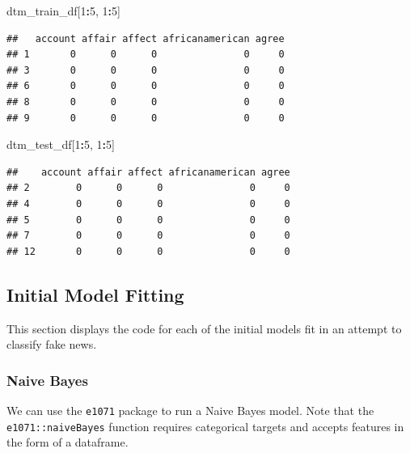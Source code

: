 \documentclass[12pt]{article}
\newenvironment{Shaded}{\begin{snugshade}}{\end{snugshade}}
\newcommand{\DecValTok}[1]{\textcolor[rgb]{0.00,0.00,0.81}{#1}}
\newcommand{\NormalTok}[1]{#1}
\newcommand{\OperatorTok}[1]{\textcolor[rgb]{0.81,0.36,0.00}{\textbf{#1}}}
\begin{document}
\begin{Shaded}
\begin{Highlighting}[]
\NormalTok{dtm_train_df[}\DecValTok{1}\OperatorTok{:}\DecValTok{5}\NormalTok{, }\DecValTok{1}\OperatorTok{:}\DecValTok{5}\NormalTok{]}
\end{Highlighting}
\end{Shaded}

\begin{verbatim}
##   account affair affect africanamerican agree
## 1       0      0      0               0     0
## 3       0      0      0               0     0
## 6       0      0      0               0     0
## 8       0      0      0               0     0
## 9       0      0      0               0     0
\end{verbatim}

\begin{Shaded}
\begin{Highlighting}[]
\NormalTok{dtm_test_df[}\DecValTok{1}\OperatorTok{:}\DecValTok{5}\NormalTok{, }\DecValTok{1}\OperatorTok{:}\DecValTok{5}\NormalTok{]}
\end{Highlighting}
\end{Shaded}

\begin{verbatim}
##    account affair affect africanamerican agree
## 2        0      0      0               0     0
## 4        0      0      0               0     0
## 5        0      0      0               0     0
## 7        0      0      0               0     0
## 12       0      0      0               0     0
\end{verbatim}

\newpage

\hypertarget{initial-model-fitting}{%
\subsection{Initial Model Fitting}\label{initial-model-fitting}}

\label{sec:appendix-initial-models}

This section displays the code for each of the initial models fit in an
attempt to classify fake news.

\hypertarget{naive-bayes}{%
\subsubsection{Naive Bayes}\label{naive-bayes}}

We can use the \texttt{e1071} package to run a Naive Bayes model. Note
that the \texttt{e1071::naiveBayes} function requires categorical
targets and accepts features in the form of a dataframe.
\end{document}
